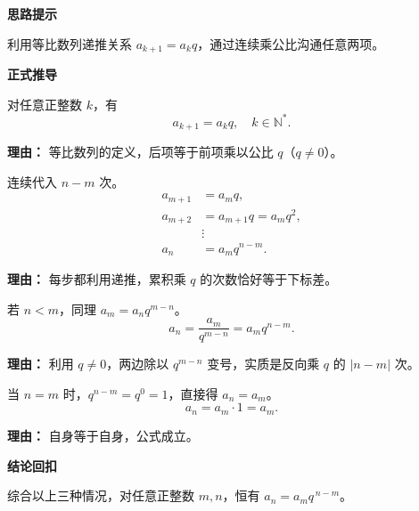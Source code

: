 \begin{proofbox}

	\textbf{\textcolor{CProof}{思路提示}}

	利用等比数列递推关系 $a_{k+1}=a_k q$，通过连续乘公比沟通任意两项。

	\medskip
	\textbf{\textcolor{CProof}{正式推导}}

	\begin{description}[style=nextline, leftmargin=2.8em, labelsep=0.5em, itemsep=0.55em]
		\item[\textbf{步骤一（递推定义）：}] 对任意正整数 $k$，有
			\[
				a_{k+1}=a_k q,\quad k\in\mathbb{N}^*.
			\]
			\par\textbf{理由：}
			等比数列的定义，后项等于前项乘以公比 $q$（$q\neq0$）。
		\item[\textbf{步骤二（$n>m$ 情形）：}] 连续代入 $n-m$ 次。
			\[
				\begin{aligned}
					a_{m+1} &= a_m q,\\
					a_{m+2} &= a_{m+1} q = a_m q^2,\\
					&\vdots\\
					a_n &= a_m q^{n-m}.
			\end{aligned}
			\]
			\par\textbf{理由：}
			每步都利用递推，累积乘 $q$ 的次数恰好等于下标差。
		\item[\textbf{步骤三（$n<m$ 情形）：}] 若 $n<m$，同理 $a_m = a_n q^{m-n}$。
			\[
				a_n = \frac{a_m}{q^{m-n}} = a_m q^{n-m}.
			\]
			\par\textbf{理由：}
			利用 $q\neq0$，两边除以 $q^{m-n}$ 变号，实质是反向乘 $q$ 的 $\lvert n-m\rvert$ 次。
		\item[\textbf{步骤四（$n=m$ 情形）：}] 当 $n=m$ 时，$q^{n-m}=q^0=1$，直接得 $a_n = a_m$。
			\[
				a_n = a_m \cdot 1 = a_m.
			\]
			\par\textbf{理由：}
			自身等于自身，公式成立。
	\end{description}

	\medskip
	\textbf{\textcolor{CProof}{结论回扣}}

	综合以上三种情况，对任意正整数 $m,n$，恒有 $a_n = a_m q^{\,n-m}$。

\end{proofbox}
